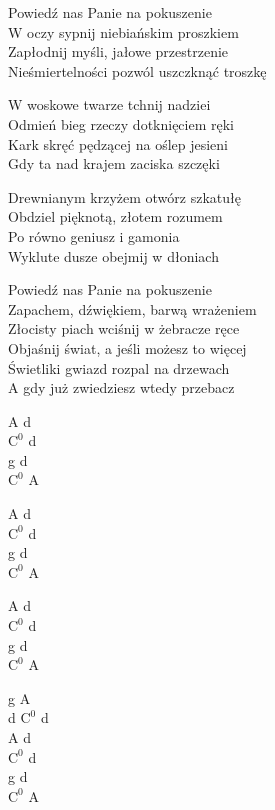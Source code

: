 \begin{text}
    Powiedź nas Panie na pokuszenie\\
    W oczy sypnij niebiańskim proszkiem\\
    Zapłodnij myśli, jałowe przestrzenie\\
    Nieśmiertelności pozwól uszczknąć troszkę

    W woskowe twarze tchnij nadziei\\
    Odmień bieg rzeczy dotknięciem ręki\\
    Kark skręć pędzącej na oślep jesieni\\
    Gdy ta nad krajem zaciska szczęki

    Drewnianym krzyżem otwórz szkatułę\\
    Obdziel pięknotą, złotem rozumem\\
    Po równo geniusz i gamonia\\
    Wyklute dusze obejmij w dłoniach

    Powiedź nas Panie na pokuszenie\\
    Zapachem, dźwiękiem, barwą wrażeniem\\
    Złocisty piach wciśnij w żebracze ręce\\
    Objaśnij świat, a jeśli możesz to więcej\\
    Świetliki gwiazd rozpal na drzewach\\
    A gdy już zwiedziesz wtedy przebacz
\end{text}
\begin{chord}
    A d\\
    $\mathrm{C^{0}}$ d\\
    g d\\
    $\mathrm{C^{0}}$ A

    A d\\
    $\mathrm{C^{0}}$ d\\
    g d\\
    $\mathrm{C^{0}}$ A

    A d\\
    $\mathrm{C^{0}}$ d\\
    g d\\
    $\mathrm{C^{0}}$ A

    g A\\
    d $\mathrm{C^{0}}$ d\\
    A d\\
    $\mathrm{C^{0}}$ d\\
    g d\\
    $\mathrm{C^{0}}$ A
\end{chord}
